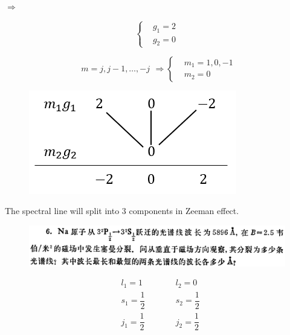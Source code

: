 \documentclass{article}
\begin{document}
$\Rightarrow $

\begin{equation*}
  \left\{
  \begin{aligned}
    & g_1 = 2 \\
    & g_2 = 0
  \end{aligned}
  \right.
\end{equation*}

\begin{equation*}
  \begin{aligned}
    m = j, j - 1, \dots, -j   
  \end{aligned}
  \Rightarrow
  \left\{
  \begin{aligned}
    & m_1 = 1,0,-1 \\
    & m_2 = 0
  \end{aligned}
  \right.
\end{equation*}

\begin{figure}[H]
  \centering
  \includegraphics[width=0.25\linewidth]{figures/Problem52}
  \label{fig:}
\end{figure}

The spectral line will split into $3$ components in Zeeman effect.

\begin{figure}[H]
  \centering
  \includegraphics[width=\linewidth]{figures/Problem6}
  \label{fig:}
\end{figure}

\begin{equation*}
  \begin{aligned}
    & l_1 = 1 \\
    & s_1 = \dfrac{1}{2}  \\
    & j_1 = \dfrac{1}{2} 
  \end{aligned}
  \quad\quad 
  \begin{aligned}
    & l_2 = 0  \\
    & s_2 = \dfrac{1}{2}  \\
    & j_2 = \dfrac{1}{2} 
  \end{aligned}
\end{equation*}
\end{document}
